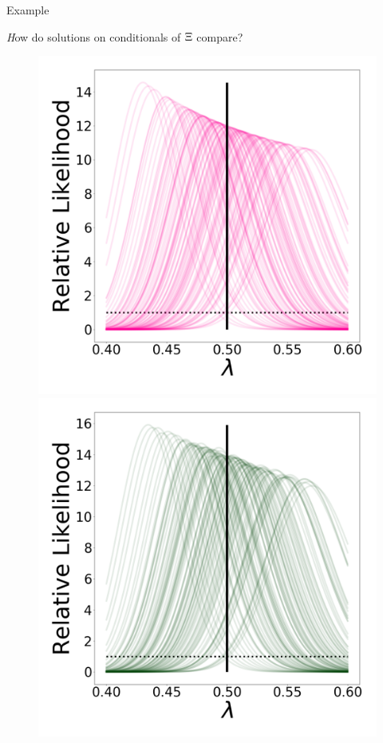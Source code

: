 \begin{block}{Example}
\vspace{-0.5cm}

{\emph How do solutions on conditionals of $\operatorname*{\Xi}$ compare?}
\vspace{-0.5cm}
    \begin{figure}
        \includegraphics[width=13cm]{figures/updated_stability_D10_sigma-10E-4}
        \includegraphics[width=13cm]{figures/posterior_stability_D10_sigma-10E-4}\\

\end{figure}
\end{block}
